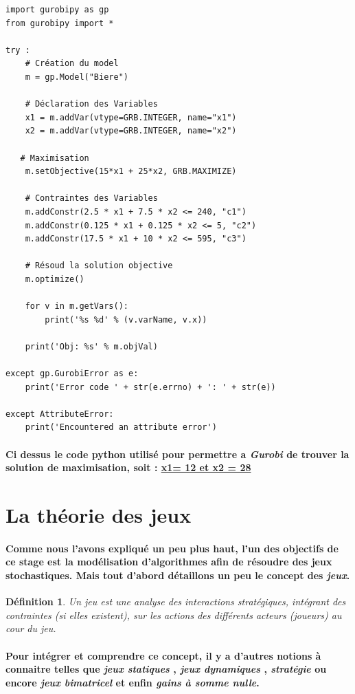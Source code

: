 \documentclass[a4paper, 12pt, twoside]{article}
\newtheorem{definition}{Définition}
\begin{document}
\begin{verbatim}
import gurobipy as gp
from gurobipy import *

try : 
    # Création du model
    m = gp.Model("Biere")

    # Déclaration des Variables
    x1 = m.addVar(vtype=GRB.INTEGER, name="x1")
    x2 = m.addVar(vtype=GRB.INTEGER, name="x2")
   
   # Maximisation
    m.setObjective(15*x1 + 25*x2, GRB.MAXIMIZE)

    # Contraintes des Variables
    m.addConstr(2.5 * x1 + 7.5 * x2 <= 240, "c1")
    m.addConstr(0.125 * x1 + 0.125 * x2 <= 5, "c2")
    m.addConstr(17.5 * x1 + 10 * x2 <= 595, "c3")
   
    # Résoud la solution objective 
    m.optimize()

    for v in m.getVars():
        print('%s %d' % (v.varName, v.x))

    print('Obj: %s' % m.objVal)

except gp.GurobiError as e:
    print('Error code ' + str(e.errno) + ': ' + str(e))

except AttributeError:
    print('Encountered an attribute error')    
\end{verbatim}
\paragraph{Ci dessus le code python utilisé pour permettre a \textit{Gurobi} de trouver la solution de maximisation, soit  : \underline{x1= 12 et x2 = 28}}
\section{La théorie des jeux}
\paragraph{Comme nous l'avons expliqué un peu plus haut, l'un des objectifs de ce stage est la modélisation d'algorithmes afin de résoudre des jeux stochastiques. Mais tout d'abord détaillons un peu le concept des \textit{jeux}.}
\begin{definition}
Un jeu est une analyse des interactions stratégiques, intégrant des contraintes (si elles existent), sur les actions des différents acteurs (joueurs) au cour du jeu.
\end{definition}
\paragraph{Pour intégrer et comprendre ce concept, il y a d'autres notions à connaitre telles que \textit{jeux statiques} , \textit{jeux dynamiques} , \textit{stratégie } ou encore \textit{jeux bimatricel} et enfin \textit{gains à somme nulle}.}
\end{document}
